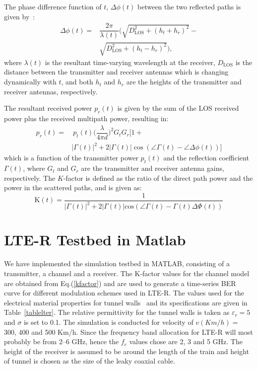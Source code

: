 The phase difference function of $t$, $\Delta\phi(t)$ between the two reflected paths is given by~\cite{booklter11}:
\begin{equation}
\begin{split}
\Delta\phi(t) =& \dfrac{2\pi}{\lambda(t)}\bigg(\sqrt{D_{\textrm{LOS}}^2+(h_t+h_r)^2}-\\
& \sqrt{D_{\textrm{LOS}}^2+(h_t-h_r)^2}\bigg),
\end{split}
\end{equation}
where $\lambda(t)$ is the resultant time-varying wavelength at the receiver, $D_{\textrm{LOS}}$ is the distance between the transmitter and receiver antennas which is changing dynamically with $t$, and both $h_t$ and $h_r$ are the heights of the transmitter and receiver antennas, respectively.
 
The resultant received power $p_r(t)$ is given by the sum of the LOS received power plus the received multipath power, resulting in:
\begin{equation}
\begin{split}
p_r(t) =& ~p_t(t)\bigg(\dfrac{\lambda}{4\pi d}\bigg)^2G_t G_r\bigg[1+\\
& |\Gamma(t)|^2+2|\Gamma(t)|\cos(\angle\Gamma(t)-\angle\Delta\phi(t))\bigg]
\end{split}
\end{equation}
which is a function of the transmitter power $p_t(t)$ and the reflection coefficient $\Gamma(t)$, where $G_t$ and $G_r$ are the transmitter and receiver antenna gains,  respectively.
The $K$-factor is defined as the ratio of the direct path power and the power in the scattered paths, and is given as:
\begin{equation}
\label{kfactor}
\mathrm{K}(t) = \dfrac{1}{|\Gamma(t)|^2+2|\Gamma(t)|\textrm{cos}(\angle \Gamma(t)-\Gamma(t)\Delta\Phi(t))}
\end{equation}

\section{LTE-R Testbed in Matlab}
We have implemented the simulation testbed in MATLAB, consisting of a transmitter, a channel and a receiver. The K-factor values for the channel model are obtained from Eq.(\ref{kfactor}) and are used to generate a time-series BER curve for different modulation schemes used in LTE-R. The values used for the electrical material properties for tunnel walls~\cite{lter17} and its
specifications are given in Table~\ref{tablelter}. The relative permittivity for the tunnel walls is taken as $\varepsilon_r = 5$ and $\sigma$ is set to 0.1. The simulation is conducted for velocity of $v (Km/h) = $ 300, 400 and 500 Km/h. Since the frequency band allocation for LTE-R will most probably be from 2--6 GHz, hence the $f_c$ values chose are 2, 3 and 5 GHz. The height of the receiver is assumed to be around the length of the train and height of tunnel is chosen as the size of the leaky coaxial cable.

